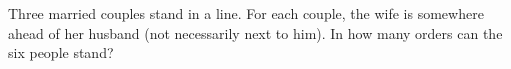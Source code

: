 Three married couples stand in a line. For each couple, the wife is somewhere ahead of her husband (not necessarily next to him). In how many orders can the six people stand?

